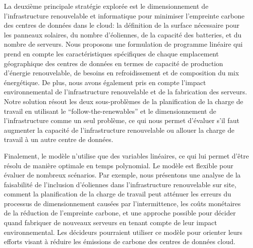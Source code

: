 La deuxième principale stratégie explorée est le dimensionnement de l'infrastructure renouvelable et informatique pour minimiser l'empreinte carbone des centres de données dans le cloud: la définition de la surface nécessaire pour les panneaux solaires, du nombre d'éoliennes, de la capacité des batteries, et du nombre de serveurs. Nous proposons une formulation de programme linéaire qui prend en compte les caractéristiques spécifiques de chaque emplacement géographique des centres de données en termes de capacité de production d'énergie renouvelable, de besoins en refroidissement et de composition du mix énergétique. De plus, nous avons également pris en compte l'impact environnemental de l'infrastructure renouvelable et de la fabrication des serveurs. Notre solution résout les deux sous-problèmes de la planification de la charge de travail en utilisant le ``follow-the-renewables'' et le dimensionnement de l'infrastructure comme un seul problème, ce qui nous permet d'évaluer s'il faut augmenter la capacité de l'infrastructure renouvelable ou allouer la charge de travail à un autre centre de données.

Finalement, le modèle n'utilise que des variables linéaires, ce qui lui permet d'être résolu de manière optimale en temps polynomial. Le modèle est flexible pour évaluer de nombreux scénarios. Par exemple, nous présentons une analyse de la faisabilité de l'inclusion d'éoliennes dans l'infrastructure renouvelable sur site, comment la planification de la charge de travail peut atténuer les erreurs du processus de dimensionnement causées par l'intermittence, les coûts monétaires de la réduction de l'empreinte carbone, et une approche possible pour décider quand fabriquer de nouveaux serveurs en tenant compte de leur impact environnemental. Les décideurs pourraient utiliser ce modèle pour orienter leurs efforts visant à réduire les émissions de carbone des centres de données cloud. \\


